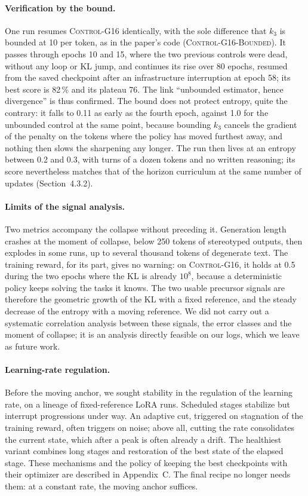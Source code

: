 \documentclass[11pt,a4paper]{article}
\begin{document}
\paragraph{Verification by the bound.} One run resumes \textsc{Control-G16} identically, with the sole difference that $k_3$ is bounded at 10 per token, as in the paper's code (\textsc{Control-G16-Bounded}). It passes through epochs 10 and 15, where the two previous controls were dead, without any loop or KL jump, and continues its rise over 80 epochs, resumed from the saved checkpoint after an infrastructure interruption at epoch 58; its best score is 82\,\% and its plateau 76. The link ``unbounded estimator, hence divergence'' is thus confirmed. The bound does not protect entropy, quite the contrary: it falls to 0.11 as early as the fourth epoch, against 1.0 for the unbounded control at the same point, because bounding $k_3$ cancels the gradient of the penalty on the tokens where the policy has moved furthest away, and nothing then slows the sharpening any longer. The run then lives at an entropy between 0.2 and 0.3, with turns of a dozen tokens and no written reasoning; its score nevertheless matches that of the horizon curriculum at the same number of updates (Section~4.3.2).

\paragraph{Limits of the signal analysis.} Two metrics accompany the collapse without preceding it. Generation length crashes at the moment of collapse, below 250 tokens of stereotyped outputs, then explodes in some runs, up to several thousand tokens of degenerate text. The training reward, for its part, gives no warning: on \textsc{Control-G16}, it holds at 0.5 during the two epochs where the KL is already $10^{8}$, because a deterministic policy keeps solving the tasks it knows. The two usable precursor signals are therefore the geometric growth of the KL with a fixed reference, and the steady decrease of the entropy with a moving reference. We did not carry out a systematic correlation analysis between these signals, the error classes and the moment of collapse; it is an analysis directly feasible on our logs, which we leave as future work.

\paragraph{Learning-rate regulation.} Before the moving anchor, we sought stability in the regulation of the learning rate, on a lineage of fixed-reference LoRA runs. Scheduled stages stabilize but interrupt progressions under way. An adaptive cut, triggered on stagnation of the training reward, often triggers on noise; above all, cutting the rate consolidates the current state, which after a peak is often already a drift. The healthiest variant combines long stages and restoration of the best state of the elapsed stage. These mechanisms and the policy of keeping the best checkpoints with their optimizer are described in Appendix~C. The final recipe no longer needs them: at a constant rate, the moving anchor suffices.
\end{document}
